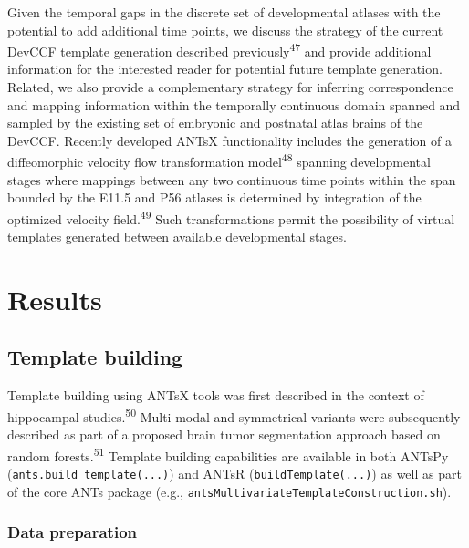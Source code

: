 \documentclass[
  12pt,
]{article}
\begin{document}
Given the temporal gaps in the discrete set of developmental atlases
with the potential to add additional time points, we discuss the
strategy of the current DevCCF template generation described
previously\textsuperscript{47} and provide additional information for
the interested reader for potential future template generation. Related,
we also provide a complementary strategy for inferring correspondence
and mapping information within the temporally continuous domain spanned
and sampled by the existing set of embryonic and postnatal atlas brains
of the DevCCF. Recently developed ANTsX functionality includes the
generation of a diffeomorphic velocity flow transformation
model\textsuperscript{48} spanning developmental stages where mappings
between any two continuous time points within the span bounded by the
E11.5 and P56 atlases is determined by integration of the optimized
velocity field.\textsuperscript{49} Such transformations permit the
possibility of virtual templates generated between available
developmental stages.

\clearpage
\newpage

\hypertarget{results}{%
\section*{Results}\label{results}}

\hypertarget{template-building}{%
\subsection*{Template building}\label{template-building}}

Template building using ANTsX tools was first described in the context
of hippocampal studies.\textsuperscript{50} Multi-modal and symmetrical
variants were subsequently described as part of a proposed brain tumor
segmentation approach based on random forests.\textsuperscript{51}
Template building capabilities are available in both ANTsPy
(\texttt{ants.build\_template(...)}) and ANTsR
(\texttt{buildTemplate(...)}) as well as part of the core ANTs package
(e.g., \texttt{antsMultivariateTemplateConstruction.sh}).

\hypertarget{data-preparation}{%
\subsubsection*{Data preparation}\label{data-preparation}}
\end{document}
